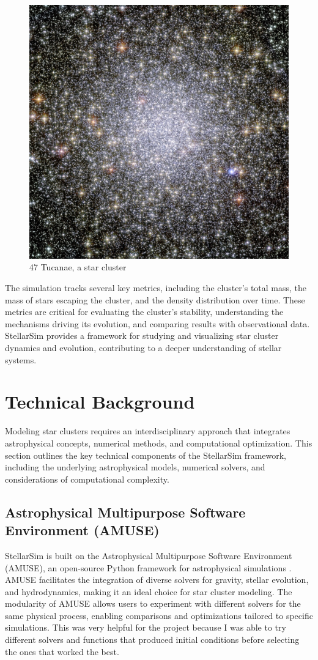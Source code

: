 \documentclass[10pt,twocolumn]{article}
\begin{document}
    \begin{figure}
        \centering
            \includegraphics[width=0.75\linewidth]{47tuc.jpg}
            \caption{47 Tucanae, a star cluster}
            \label{fig:47tuc, a star cluster visible with the naked eye}
    \end{figure}


The simulation tracks several key metrics, including the cluster's total mass, the mass of stars escaping the cluster, and the density distribution over time. These metrics are critical for evaluating the cluster's stability, understanding the mechanisms driving its evolution, and comparing results with observational data. StellarSim provides a framework for studying and visualizing star cluster dynamics and evolution, contributing to a deeper understanding of stellar systems.

\section{Technical Background}
Modeling star clusters requires an interdisciplinary approach that integrates astrophysical concepts, numerical methods, and computational optimization. This section outlines the key technical components of the StellarSim framework, including the underlying astrophysical models, numerical solvers, and considerations of computational complexity.

\subsection{Astrophysical Multipurpose Software Environment (AMUSE)}
StellarSim is built on the Astrophysical Multipurpose Software Environment (AMUSE), an open-source Python framework for astrophysical simulations \cite{portegies2018amuse}. AMUSE facilitates the integration of diverse solvers for gravity, stellar evolution, and hydrodynamics, making it an ideal choice for star cluster modeling. The modularity of AMUSE allows users to experiment with different solvers for the same physical process, enabling comparisons and optimizations tailored to specific simulations. This was very helpful for the project because I was able to try different solvers and functions that produced initial conditions before selecting the ones that worked the best.
\end{document}
